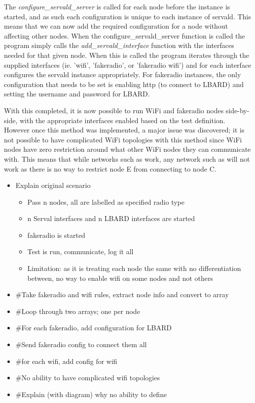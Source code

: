 The \emph{configure\_servald\_server} is called for each node before the instance is started, and as such each configuration is unique to each instance of servald.
This means that we can now add the required configuration for a node without affecting other nodes.
When the configure\_servald\_server function is called the program simply calls the \emph{add\_servald\_interface} function with the interfaces needed for that given node.
When this is called the program iterates through the supplied interfaces (ie. 'wifi', 'fakeradio', or 'fakeradio wifi') and for each interface configures the servald instance appropriately.
For fakeradio instances, the only configuration that needs to be set is enabling http (to connect to LBARD) and setting the username and password for LBARD.

With this completed, it is now possible to run WiFi and fakeradio nodes side-by-side, with the appropriate interfaces enabled based on the test definition.
However once this method was implemented, a major issue was discovered; it is not possible to have complicated WiFi topologies with this method since WiFi nodes have zero restriction around what other WiFi nodes they can communicate with.
This means that while networks such as  work, any network such as  will not work as there is no way to restrict node E from connecting to node C.


\begin{itemize}
    \item Explain original scenario
    \begin{itemize}
        \item Pass n nodes, all are labelled as specified radio type
        \item n Serval interfaces and n LBARD interfaces are started
        \item fakeradio is started
        \item Test is run, communicate, log it all
        \item Limitation: as it is treating each node the same with no differentiation between, no way to enable wifi on some nodes and not others
    \end{itemize}
    \item \#Take fakeradio and wifi rules, extract node info and convert to array
    \item \#Loop through two arrays; one per node
    \item \#For each fakeradio, add configuration for LBARD
    \item \#Send fakeradio config to connect them all
    \item \#for each wifi, add config for wifi
    \item \#No ability to have complicated wifi topologies
    \item \#Explain (with diagram) why no ability to define
\end{itemize}



